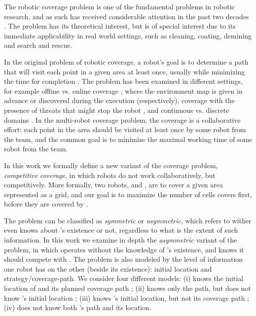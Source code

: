 The robotic coverage problem is one of the fundamental problems in robotic research, and as such has received considerable attention in the past two decades \cite{galceran2013survey}. The problem has its theoretical interest, but is of special interest due to its immediate applicability in real world settings, such as cleaning, coating, demining and search and rescue. 

In the original problem of robotic coverage, a robot's goal is to determine a path that will visit each point in a given area at least once, usually while minimizing the time for completion \cite{galceran2013survey}. The problem has been examined in different settings, for example offline vs. online coverage \cite{gabriely2001spanning,agmon2008giving}, where the environment map is given in advance or discovered during the execution (respectively), coverage with the presence of threats that might stop the robot \cite{yehoshua2014safest}, and continuous vs. discrete domains \cite{gabriely2001spanning,yang2004neural}. In the multi-robot coverage problem, the coverage is a collaborative effort: each point in the area should be visited at least once by some robot from the team, and the common goal is to minimize the maximal working time of some robot from the team. 

In this work we formally define a new variant of the coverage problem, {\em competitive coverage}, in which robots do not work collaboratively, but competitively. More formally, two robots, \rob and \opp, are to cover a given area represented as a grid, and our goal is to maximize the number of cells \rob covers first, before they are covered by \opp.

The problem can be classified as {\em symmetric} or {\em asymmetric}, which refers to wither \opp even knows about \rob's existence or not, regardless to what is the extent of such information. In this work we examine in depth the {\em asymmetric} variant of the problem, in which \opp operates without the knowledge of \rob's existence, and \rob knows it should compete with \opp. The problem is also modeled by the level of information one robot has on the other (beside its existence): initial location and strategy/coverage-path. We consider four different models: (i) \rob knows the initial location of \opp and its planned coverage path ; (ii) \rob knows only the path, but does not know \opp's initial location ; (iii) \rob knows \opp's initial location, but not its coverage path ; (iv) \rob does not know both \opp's path and its location.

